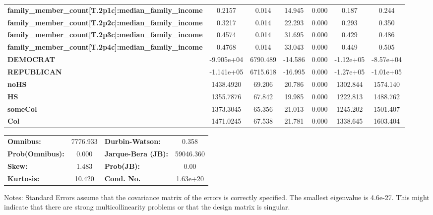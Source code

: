 \documentclass{report}
\begin{document}
\begin{center}
\begin{tabular}{lcccccc}
\textbf{family\_member\_count[T.2p1c]:median\_family\_income} &       0.2157  &        0.014     &    14.945  &         0.000        &        0.187    &        0.244     \\
\textbf{family\_member\_count[T.2p2c]:median\_family\_income} &       0.3217  &        0.014     &    22.293  &         0.000        &        0.293    &        0.350     \\
\textbf{family\_member\_count[T.2p3c]:median\_family\_income} &       0.4574  &        0.014     &    31.695  &         0.000        &        0.429    &        0.486     \\
\textbf{family\_member\_count[T.2p4c]:median\_family\_income} &       0.4768  &        0.014     &    33.043  &         0.000        &        0.449    &        0.505     \\
\textbf{DEMOCRAT}                                             &   -9.905e+04  &     6790.489     &   -14.586  &         0.000        &    -1.12e+05    &    -8.57e+04     \\
\textbf{REPUBLICAN}                                           &   -1.141e+05  &     6715.618     &   -16.995  &         0.000        &    -1.27e+05    &    -1.01e+05     \\
\textbf{noHS}                                                 &    1438.4920  &       69.206     &    20.786  &         0.000        &     1302.844    &     1574.140     \\
\textbf{HS}                                                   &    1355.7876  &       67.842     &    19.985  &         0.000        &     1222.813    &     1488.762     \\
\textbf{someCol}                                              &    1373.3045  &       65.356     &    21.013  &         0.000        &     1245.202    &     1501.407     \\
\textbf{Col}                                                  &    1471.0245  &       67.538     &    21.781  &         0.000        &     1338.645    &     1603.404     \\
\bottomrule
\end{tabular}
\begin{tabular}{lclc}
\textbf{Omnibus:}       & 7776.933 & \textbf{  Durbin-Watson:     } &     0.358  \\
\textbf{Prob(Omnibus):} &   0.000  & \textbf{  Jarque-Bera (JB):  } & 59046.360  \\
\textbf{Skew:}          &   1.483  & \textbf{  Prob(JB):          } &      0.00  \\
\textbf{Kurtosis:}      &  10.420  & \textbf{  Cond. No.          } &  1.63e+20  \\
\bottomrule
\end{tabular}
\end{center}

Notes: \newline
 [1] Standard Errors assume that the covariance matrix of the errors is correctly specified. \newline
 [2] The smallest eigenvalue is 4.6e-27. This might indicate that there are \newline
 strong multicollinearity problems or that the design matrix is singular.
\end{document}
